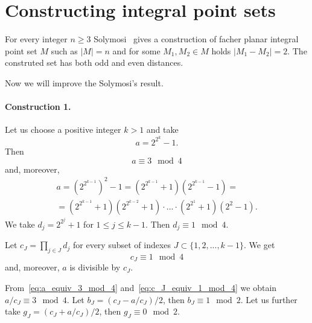\documentclass[a4paper,14pt]{article} %
\theoremstyle{plain}
\begin{document}
\section{Constructing integral point sets}
For every integer $n\geq 3$ Solymosi~\cite{solymosi2003note} gives a construction of facher planar integral point set $M$
such as $|M| = n$ and for some $M_1, M_2 \in M$ holds $|M_1 - M_2| = 2$.
The construted set has both odd and even distances.

Now we will improve the Solymosi's result.

\paragraph{Construction 1.}
Let us choose a positive integer $k > 1$ and take
\begin{equation}
	a = 2^{2^k} - 1
	.
\end{equation}
Then
\begin{equation}
	\label{eq:a_equiv_3_mod_4}
	a \equiv 3 \mod 4
\end{equation}
and, moreover,
\begin{multline}
	a = \left(2^{2^{k-1}}\right)^2 - 1
	=
	\left(2^{2^{k-1}} + 1\right) \left(2^{2^{k-1}} - 1\right)
	=
	\\=
	\left(2^{2^{k-1}} + 1\right) \left(2^{2^{k-2}} + 1\right) \cdot ... \cdot \left(2^{2^1} + 1\right) \left(2^2 - 1\right)
	.
\end{multline}
We take $d_j = 2^{2^j} + 1$ for $1 \leq j \leq k-1$.
Then $d_j \equiv 1 \mod 4$.

Let $c_J = \prod_{j\in J} d_j$ for every subset of indexes $J\subset\{1,2,...,k-1\}$.
We get
\begin{equation}
	\label{eq:c_J_equiv_1_mod_4}
	c_J\equiv 1 \mod{4}
\end{equation}
and, moreover, $a$ is divisible by $c_J$.

From~\eqref{eq:a_equiv_3_mod_4} and~\eqref{eq:c_J_equiv_1_mod_4} we obtain $a/c_J \equiv 3 \mod 4$.
Let $b_J = (c_J - a/c_J)/2$, then $b_J \equiv 1 \mod 2$.
Let us further take $g_J = (c_J + a/c_J)/2$, then $g_J \equiv 0 \mod 2$.
\end{document}
